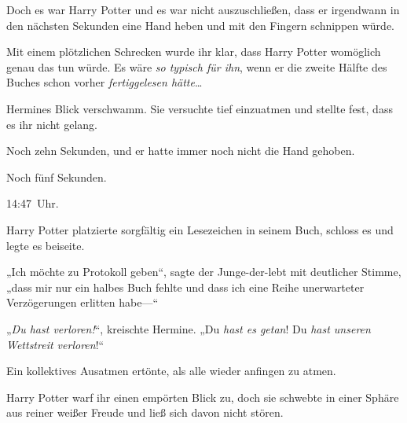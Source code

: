 Doch es war Harry Potter und es war nicht auszuschließen, dass er irgendwann in den nächsten Sekunden eine Hand heben und mit den Fingern schnippen würde.

Mit einem plötzlichen Schrecken wurde ihr klar, dass Harry Potter womöglich genau das tun würde. Es wäre \emph{so typisch für ihn}, wenn er die zweite Hälfte des Buches schon vorher \emph{fertiggelesen hätte}…

Hermines Blick verschwamm. Sie versuchte tief einzuatmen und stellte fest, dass es ihr nicht gelang.

Noch zehn Sekunden, und er hatte immer noch nicht die Hand gehoben.

Noch fünf Sekunden.

14:47~Uhr.

Harry Potter platzierte sorgfältig ein Lesezeichen in seinem Buch, schloss es und legte es beiseite.

„Ich möchte zu Protokoll geben“, sagte der Junge-der-lebt mit deutlicher Stimme, „dass mir nur ein halbes Buch fehlte und dass ich eine Reihe unerwarteter Verzögerungen erlitten habe—“

„\emph{Du hast verloren!}“, kreischte Hermine. „Du \emph{hast es getan}! Du \emph{hast unseren Wettstreit verloren}!“

Ein kollektives Ausatmen ertönte, als alle wieder anfingen zu atmen.

Harry Potter warf ihr einen empörten Blick zu, doch sie schwebte in einer Sphäre aus reiner weißer Freude und ließ sich davon nicht stören.

